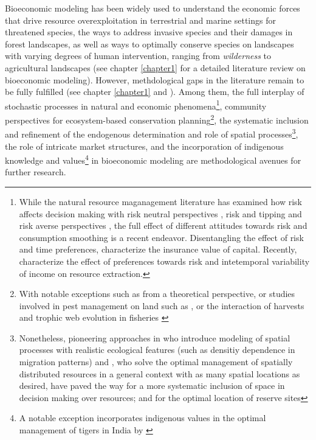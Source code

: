 Bioeconomic modeling has been widely used to understand the economic forces that drive resource overexploitation in terrestrial and marine settings for threatened species, the ways to address invasive species and their damages in forest landscapes, as well as ways to optimally conserve species on landscapes with varying degrees of human intervention, ranging from \textit{wilderness} to agricultural landscapes (see chapter \ref{chapter1} for a detailed literature review on bioeconomic modeling).
However, methdological gaps in the literature remain to be fully fulfilled (see chapter \ref{chapter1} and \cite{Drechsler20200}). Among them, the full interplay of stochastic processes in natural and economic phenomena\footnote{While the natural resource maganagement literature has examined how risk affects decision making with risk neutral perspectives \citep{reed_1979_optimal, costello_optimal_2008}, risk and tipping \citep{costello_renewable_2019} and risk averse perspectives \citep{McGoughPlantingaCostello+2009,kapaun_does_2013,TAHVONEN2018659}, the full effect of different attitudes towards risk and consumption smoothing is a recent endeavor. Disentangling the effect of risk and time preferences, \cite{quaas_2019_insurance, AugeraudVeron2019} characterize the insurance value of capital. Recently, \cite{KELSALL2023102855} characterize the effect of preferences towards risk and intetemporal variability of income on resource extraction.}, community perspectives for ecosystem-based conservation planning\footnote{With notable exceptions such as \cite{Brock2003} from a theoretical perspective, or studies involved in pest management on land such as \cite{Higgins1997_dynamic}, or the interaction of harvests and trophic web evolution in fisheries \citep{glaum_integrating_2020}}, the systematic inclusion and refinement of the endogenous determination and role of spatial processes\footnote{Nonetheless, pioneering approaches in \cite{ sanchirico_bioeconomics_1999} who introduce modeling of spatial processes with realistic ecological features (such as densitiy dependence in migration patterns) and \cite{costello_optimal_2008, costello_private_2017}, who solve the optimal management of spatially distributed resources in a general context with as many spatial locations as desired, have paved the way for a more systematic inclusion of space in decision making over resources; and \cite{Costello2004} for the optimal location of reserve sites}, the role of intricate market structures, and the incorporation of indigenous knowledge and values\footnote{A notable exception incorporates indigenous values in the optimal management of tigers in India by \cite{Lopes2020}} in bioeconomic modeling \citep{IPBES2016} are methodological avenues for further research.

